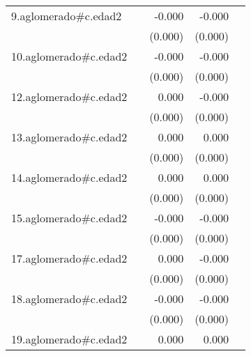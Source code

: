 {\begin{longtable}{l*{4}{D{.}{.}{-1}}}
\addlinespace
9.aglomerado#c.edad2&                     &      -0.000         &      -0.000\sym{**} &                     \\
            &                     &     (0.000)         &     (0.000)         &                     \\
\addlinespace
10.aglomerado#c.edad2&                     &      -0.000         &      -0.000         &                     \\
            &                     &     (0.000)         &     (0.000)         &                     \\
\addlinespace
12.aglomerado#c.edad2&                     &       0.000         &      -0.000         &                     \\
            &                     &     (0.000)         &     (0.000)         &                     \\
\addlinespace
13.aglomerado#c.edad2&                     &       0.000         &       0.000         &                     \\
            &                     &     (0.000)         &     (0.000)         &                     \\
\addlinespace
14.aglomerado#c.edad2&                     &       0.000         &       0.000         &                     \\
            &                     &     (0.000)         &     (0.000)         &                     \\
\addlinespace
15.aglomerado#c.edad2&                     &      -0.000         &      -0.000\sym{*}  &                     \\
            &                     &     (0.000)         &     (0.000)         &                     \\
\addlinespace
17.aglomerado#c.edad2&                     &       0.000         &      -0.000         &                     \\
            &                     &     (0.000)         &     (0.000)         &                     \\
\addlinespace
18.aglomerado#c.edad2&                     &      -0.000         &      -0.000         &                     \\
            &                     &     (0.000)         &     (0.000)         &                     \\
\addlinespace
19.aglomerado#c.edad2&                     &       0.000         &       0.000         &                     \\

\end{longtable}}
